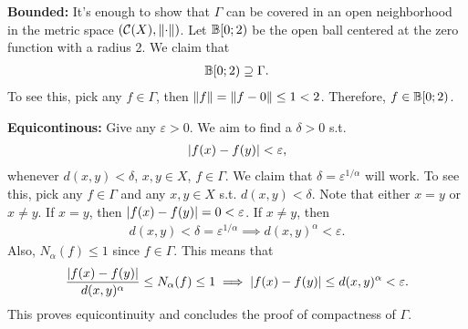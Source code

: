\documentclass[12pt]{article}
\begin{document}
\begin{fproof}[1(a)]


\textbf{Bounded:}
It's enough to show that \(\Gamma\) can be covered in an open neighborhood in the metric space \((\mathcal{C}(X), \left\lVert \cdot \right\rVert)\).
Let \(\mathbb{B}[0; 2)\) be the open ball centered at the zero function with a radius 2.
We claim that 
\begin{align*}
    \mathbb{B}[0; 2) \supseteq \Gamma.
\end{align*}
To see this, pick any \(f \in \Gamma\), then \(\left\lVert f \right\rVert = \left\lVert f - 0 \right\rVert \leq 1 < 2\).
Therefore, \(f \in \mathbb{B}[0; 2)\).

\textbf{Equicontinous:}
Give any \(\varepsilon > 0\).
We aim to find a \(\delta > 0\) s.t.
\begin{align*}
    \left\lvert f(x)-f(y) \right\rvert < \varepsilon,
\end{align*}
whenever \(d(x,y) < \delta\), \(x,y \in X\), \(f \in \Gamma\).
We claim that \(\delta = \varepsilon^{1/\alpha}\) will work.
To see this, pick any \(f \in \Gamma\) and any \(x,y \in X\) s.t. \(d(x,y) < \delta\).
Note that either \(x=y\) or \(x\neq y\).
If \(x=y\), then \(\left\lvert f(x)-f(y) \right\rvert = 0 < \varepsilon\).
If \(x \neq y\), then
\begin{align*}
    d(x,y) < \delta = \varepsilon^{1/\alpha} \implies d(x,y)^{\alpha} < \varepsilon.
\end{align*}
Also, \(N_{\alpha}(f) \leq 1\) since \(f \in \Gamma\).
This means that
\begin{align*}
    \frac{\left\lvert f(x)-f(y) \right\rvert}{d(x,y)^{\alpha}} \leq N_{\alpha}(f) \leq 1 \implies \left\lvert f(x)-f(y) \right\rvert \leq d(x,y)^{\alpha} < \varepsilon.
\end{align*}
This proves equicontinuity and concludes the proof of compactness of \(\Gamma\).
\end{fproof}
\end{document}
